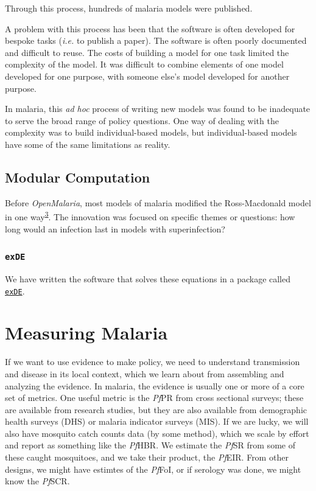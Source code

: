 \documentclass[
]{book}
\begin{document}
Through this process, hundreds of malaria models were published.

A problem with this process has been that the software is often developed for bespoke tasks (\emph{i.e.} to publish a paper). The software is often poorly documented and difficult to reuse. The costs of building a model for one task limited the complexity of the model. It was difficult to combine elements of one model developed for one purpose, with someone else's model developed for another purpose.

In malaria, this \emph{ad hoc} process of writing new models was found to be inadequate to serve the broad range of policy questions. One way of dealing with the complexity was to build individual-based models, but individual-based models have some of the same limitations as reality.

\hypertarget{modular-computation}{%
\section{Modular Computation}\label{modular-computation}}

Before \emph{OpenMalaria}, most models of malaria modified the Ross-Macdonald model in one way\textsuperscript{\protect\hyperlink{ref-ReinerRC2013SystematicReview}{3}}. The innovation was focused on specific themes or questions: how long would an infection last in models with superinfection?

\hypertarget{exde}{%
\subsection{\texorpdfstring{\texttt{exDE}}{exDE}}\label{exde}}

We have written the software that solves these equations in a package called \href{https://cran.r-project.org/web/packages/exDE/index.html}{\texttt{exDE}}.

\hypertarget{measuring-malaria}{%
\chapter{Measuring Malaria}\label{measuring-malaria}}

If we want to use evidence to make policy, we need to understand transmission and disease in its local context, which we learn about from assembling and analyzing the evidence. In malaria, the evidence is usually one or more of a core set of metrics. One useful metric is the \emph{Pf}PR from cross sectional surveys; these are available from research studies, but they are also available from demographic health surveys (DHS) or malaria indicator surveys (MIS). If we are lucky, we will also have mosquito catch counts data (by some method), which we scale by effort and report as something like the \emph{Pf}HBR. We estimate the \emph{Pf}SR from some of these caught mosquitoes, and we take their product, the \emph{Pf}EIR. From other designs, we might have estimtes of the \emph{Pf}FoI, or if serology was done, we might know the \emph{Pf}SCR.
\end{document}
